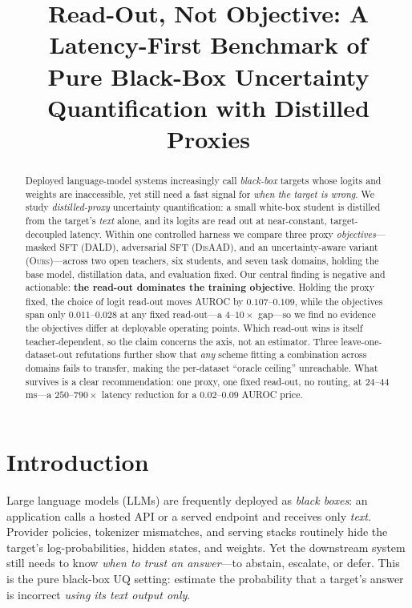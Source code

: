 \documentclass[11pt]{article}
\title{Read-Out, Not Objective: A Latency-First Benchmark of \\
Pure Black-Box Uncertainty Quantification with Distilled Proxies}
\newcommand{\ours}{\textsc{Ours}}
\newcommand{\dald}{\textsc{DALD}}
\newcommand{\disaad}{\textsc{DisAAD}}
\begin{document}
\maketitle

\begin{abstract}
Deployed language-model systems increasingly call \emph{black-box} targets whose logits and
weights are inaccessible, yet still need a fast signal for \emph{when the target is wrong}. We
study \emph{distilled-proxy} uncertainty quantification: a small white-box student is distilled
from the target's \emph{text} alone, and its logits are read out at near-constant,
target-decoupled latency. Within one controlled harness we compare three proxy
\emph{objectives}---masked SFT (\dald), adversarial SFT (\disaad), and an uncertainty-aware
variant (\ours)---across two open teachers, six students, and seven task domains, holding the
base model, distillation data, and evaluation fixed. Our central finding is negative and
actionable: \textbf{the read-out dominates the training objective}. Holding the proxy fixed, the
choice of logit read-out moves AUROC by $0.107$--$0.109$, while the objectives span only
$0.011$--$0.028$ at any fixed read-out---a $4$--$10\times$ gap---so we find no evidence the
objectives differ at deployable operating points. Which read-out wins is itself
teacher-dependent, so the claim concerns the axis, not an estimator. Three leave-one-dataset-out
refutations further show that \emph{any} scheme fitting a combination across domains fails to
transfer, making the per-dataset ``oracle ceiling'' unreachable. What survives is a clear
recommendation: one proxy, one fixed read-out, no routing, at $24$--$44$\,ms---a
$250$--$790\times$ latency reduction for a $0.02$--$0.09$ AUROC price.
\end{abstract}

\section{Introduction}
Large language models (LLMs) are frequently deployed as \emph{black boxes}: an
application calls a hosted API or a served endpoint and receives only \emph{text}.
Provider policies, tokenizer mismatches, and serving stacks routinely hide the
target's log-probabilities, hidden states, and weights. Yet the downstream system
still needs to know \emph{when to trust an answer}---to abstain, escalate, or defer.
This is the pure black-box UQ setting: estimate the probability that a target's answer
is incorrect \emph{using its text output only}.
\end{document}
